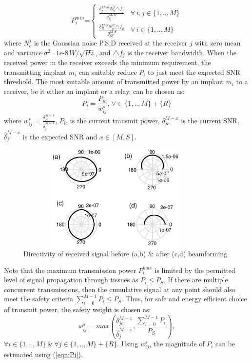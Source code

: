 \begin{equation} \label{eqn:Ptmin}
P^{min}_{i}\text{=}\begin{cases}
\displaystyle \frac{\delta_j^{M\text{-}M}N_o^{j}\triangle f_j}{g_{ij}^{M\text{-}M}} & \forall\, i,j \in \{1,..,M\}\\
\displaystyle  \frac{\delta_R^{M\text{-}S}N_o^{R}\triangle f_R}{g_{iR}^{M\text{-}S}} & \forall\, i \in \{1,..,M\}
\end{cases}
\end{equation}
where $N_o^{j}$ is the Gaussian noise P.S.D received at the receiver $j$ with zero mean and variance $\sigma^2$=$1e\text{-}8\,W/\sqrt{Hz}$, and $\triangle f_j$ is the receiver bandwidth. When the received power in the receiver exceeds the minimum requirement, the transmitting implant $m_i$ can suitably reduce $P_i$ to just meet the expected SNR threshold. The most suitable amount of transmitted power by an implant $m_i$ to a receiver, be it either an implant or a relay, can be chosen as: 
\begin{equation}\label{eqn:Pi}
P_i = \frac{P_{ic}}{w_{ij}^s}, \,\forall \in\{1,..,M\} + \{R\}
\end{equation}
where $w_{ij}^s$ = $\displaystyle \frac{\delta_{jc}^{M-x}}{\hat{\delta}_{j}^{M-x}}$, $P_{ic}$ is the current transmit power, $\delta_{jc}^{M-x}$ is the current SNR, $\hat{\delta}_j^{M-x}$ is the expected SNR and $x\in [M,S]$.  
  
\begin{figure}[t]
 \centering
 \vspace{-2mm}  %
\includegraphics[width=10cm,height=5.3cm]{figures/GC_beamforming/polar1.eps}  
\vspace{-8mm} 
 \caption{\label{fig:polar} Directivity of received signal before (a,b) \& after (c,d) beamforming}
 \vspace{-7mm} 
\end{figure}
  
Note that the maximum transmission power $P^{max}_i$ is limited by the permitted level of signal propagation through tissues as $P_i\leq P_S$. If there are multiple concurrent transmissions, then the cumulative signal at any point should also meet the safety criteria $\sum_{i=0}^{M-1} P_i\leq P_S$. Thus, for safe and energy efficient choice of transmit power, the safety weight is chosen as:
\begin{equation} \label{e:ws}
w_{ij}^s = max\left( \frac{\delta_{jc}^{M-x}}{\hat{\delta}_{j}^{M-x}},\frac{\sum_{i=0}^{M-1} P_i}{P_S} \right),
\end{equation}
$\forall i\in\{1,..,M\}\  \&\  \forall j\in\{1,..,M\} + \{R\}$. Using $w_{ij}^s$, the magnitude of $P_i$ can be estimated using (\ref{eqn:Pi}).
 
